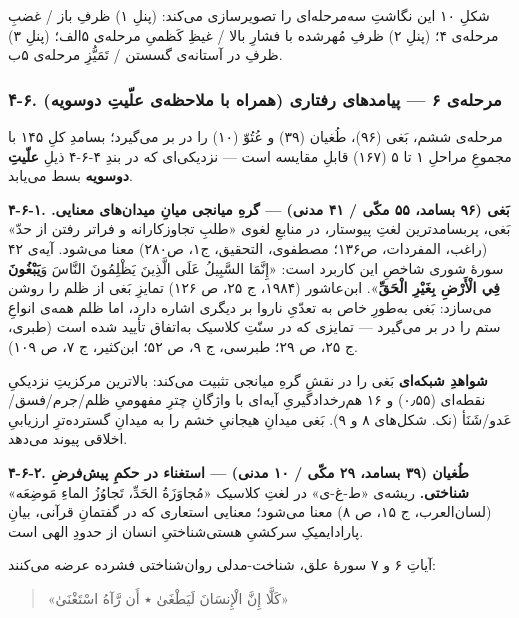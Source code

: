 \documentclass[12pt,a4paper]{article}
\begin{document}
\begin{RTL}
\begin{otherlanguage}{persian}
شکلِ ۱۰ این نگاشتِ سه‌مرحله‌ای را تصویرسازی می‌کند: (پنلِ ۱) ظرفِ باز / غضبِ
مرحله‌ی ۴؛ (پنلِ ۲) ظرفِ مُهرشده با فشارِ بالا / غیظِ کَظمیِ مرحله‌ی ۵الف؛ (پنلِ
۳) ظرفِ در آستانه‌ی گسستن / تَمَیُّزِ مرحله‌ی ۵ب.

\subsubsection{۴-۶. مرحله‌ی ۶ --- پیامدهای رفتاری (همراه با ملاحظه‌ی علّیتِ
دوسویه)}\label{ux645ux631ux62dux644ux647ux6cc-ux6f6-ux67eux6ccux627ux645ux62fux647ux627ux6cc-ux631ux641ux62aux627ux631ux6cc-ux647ux645ux631ux627ux647-ux628ux627-ux645ux644ux627ux62dux638ux647ux6cc-ux639ux644ux6ccux62a-ux62fux648ux633ux648ux6ccux647}

مرحله‌ی ششم، بَغی (۹۶)، طُغیان (۳۹) و عُتُوّ (۱۰) را در بر می‌گیرد؛ بسامدِ کلِ
۱۴۵ با مجموعِ مراحلِ ۱ تا ۵ (۱۶۷) قابلِ مقایسه است --- نزدیکی‌ای که در بندِ
۴-۶-۴ ذیلِ \textbf{علّیتِ دوسویه} بسط می‌یابد.

\textbf{۴-۶-۱. بَغی (۹۶ بسامد، ۵۵ مکّی / ۴۱ مدنی) --- گرهِ میانجی میانِ
میدان‌های معنایی.} بَغی، پربسامدترین لغتِ پیوستار، در منابعِ لغوی «طلبِ
تجاوزکارانه و فراتر رفتن از حدّ» (راغب، المفردات، ص۱۳۶؛ مصطفوی، التحقیق،
ج۱، ص۲۸۰) معنا می‌شود. آیه‌ی ۴۲ سورۀ شوری شاخصِ این کاربرد است: «إِنَّمَا
السَّبِيلُ عَلَى الَّذِينَ يَظْلِمُونَ النَّاسَ وَ\textbf{يَبْغُونَ فِي الْأَرْضِ بِغَيْرِ الْحَقِّ}».
ابن‌عاشور (۱۹۸۴، ج ۲۵، ص ۱۲۶) تمایزِ بَغی از ظلم را روشن می‌سازد: بَغی به‌طورِ
خاص به تعدّیِ ناروا بر دیگری اشاره دارد، اما ظلم همه‌ی انواعِ ستم را در بر
می‌گیرد --- تمایزی که در سنّتِ کلاسیک به‌اتفاق تأیید شده است (طبری، ج ۲۵، ص
۲۹؛ طبرسی، ج ۹، ص ۵۲؛ ابن‌کثیر، ج ۷، ص ۱۰۹).

\textbf{شواهدِ شبکه‌ای} بَغی را در نقشِ گرهِ میانجی تثبیت می‌کند: بالاترین
مرکزیتِ نزدیکیِ نقطه‌ای (۰٫۵۵) و ۱۶ هم‌رخدادگیریِ آیه‌ای با واژگانِ چترِ مفهومیِ
ظلم/جرم/فسق/عَدو/شَنَأ (نک. شکل‌های ۸ و ۹). بَغی میدانِ هیجانیِ خشم را به میدانِ
گسترده‌ترِ ارزیابیِ اخلاقی پیوند می‌دهد.

\textbf{۴-۶-۲. طُغیان (۳۹ بسامد، ۲۹ مکّی / ۱۰ مدنی) --- استغناء در حکمِ
پیش‌فرضِ شناختی.} ریشه‌ی «ط-غ-ی» در لغتِ کلاسیک «مُجاوَزَةُ الحَدِّ، تَجاوُزُ الماءِ
مَوضِعَه» (لسان‌العرب، ج ۱۵، ص ۸) معنا می‌شود؛ معنایی استعاری که در گفتمانِ
قرآنی، بیانِ پارادایمیکِ سرکشیِ هستی‌شناختیِ انسان از حدودِ الهی است.

آیاتِ ۶ و ۷ سورۀ علق، شناخت-مدلی روان‌شناختی فشرده عرضه می‌کنند:

\begin{quote}
«كَلَّا إِنَّ الْإِنسَانَ لَيَطْغَىٰ ٭ أَن رَّآهُ اسْتَغْنَىٰ»
\end{quote}


\end{otherlanguage}
\end{RTL}
\end{document}
